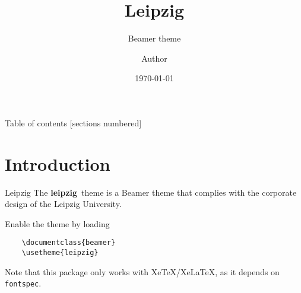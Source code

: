 \documentclass[noserifmath,aspectratio=169]{beamer}
\title[Leipzig]{Leipzig}
\subtitle[Beamer Theme]{Beamer theme}
\author{Author}
\institute{Institute}
\date{\today}
\newcommand{\themename}{\textbf{leipzig}~}
\begin{document}
\maketitle

\begin{frame}{Table of contents}
  [sections numbered]
  \tableofcontents[hideallsubsections]
\end{frame}

\section{Introduction}

\begin{frame}[fragile]{Leipzig}
The \themename theme is a Beamer theme that complies with the corporate design of the Leipzig University.

Enable the theme by loading
\begin{verbatim}
    \documentclass{beamer}
    \usetheme{leipzig}
\end{verbatim}

Note that this package only works with XeTeX/XeLaTeX, as it depends on \texttt{fontspec}.
\end{frame}
\end{document}
